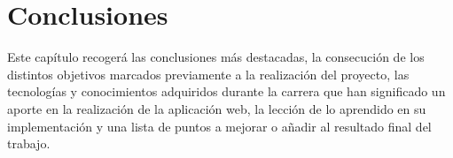 \documentclass[a4paper, 12pt]{book}
\begin{document}

\cleardoublepage
\chapter{Conclusiones}
\label{chap:conclusiones}
Este cap\'itulo recoger\'a las conclusiones m\'as destacadas, la consecuci\'on de los distintos objetivos marcados previamente a la realizaci\'on del proyecto, las tecnolog\'ias y 
conocimientos adquiridos durante la carrera que han significado un aporte en la realizaci\'on de la aplicaci\'on web, la lecci\'on de lo aprendido en su implementaci\'on 
y una lista de puntos a mejorar o a\~nadir al resultado final del trabajo.
\end{document}
